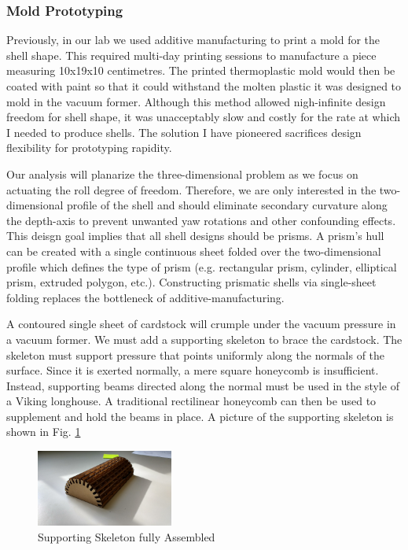 \documentclass[letterpaper]{report}
\begin{document}
\subsubsection{Mold Prototyping}
\label{sec:Molds}
Previously, in our lab we used additive manufacturing to print a mold for the shell shape.
This required multi-day printing sessions to manufacture a piece measuring 10x19x10 centimetres.
The printed thermoplastic mold would then be coated with paint so that it could withstand the molten plastic it was designed to mold in the vacuum former.
Although this method allowed nigh-infinite design freedom for shell shape, it was unacceptably slow and costly for the rate at which I needed to produce shells.
The solution I have pioneered sacrifices design flexibility for prototyping rapidity.

Our analysis will planarize the three-dimensional problem as we focus on actuating the roll degree of freedom.
Therefore, we are only interested in the two-dimensional profile of the shell and should eliminate secondary curvature along the depth-axis to prevent unwanted yaw rotations and other confounding effects.
This deisgn goal implies that all shell designs should be prisms.
A prism's hull can be created with a single continuous sheet folded over the two-dimensional profile which defines the type of prism (e.g. rectangular prism, cylinder, elliptical prism, extruded polygon, etc.).
Constructing prismatic shells via single-sheet folding replaces the bottleneck of additive-manufacturing.

A contoured single sheet of cardstock will crumple under the vacuum pressure in a vacuum former.
We must add a supporting skeleton to brace the cardstock.
The skeleton must support pressure that points uniformly along the normals of the surface.
Since it is exerted normally, a mere square honeycomb is insufficient.
Instead, supporting beams directed along the normal must be used in the style of a Viking longhouse.
A traditional rectilinear honeycomb can then be used to supplement and hold the beams in place.
A picture of the supporting skeleton is shown in Fig. \ref{fig:ManufactureSkeleton}

\begin{figure}[ht]
\centering
\includegraphics[width=0.4\textwidth]{SupportingSkeleton.jpg}
\caption{\label{fig:ManufactureSkeleton}Supporting Skeleton fully Assembled}
\end{figure}
\end{document}
